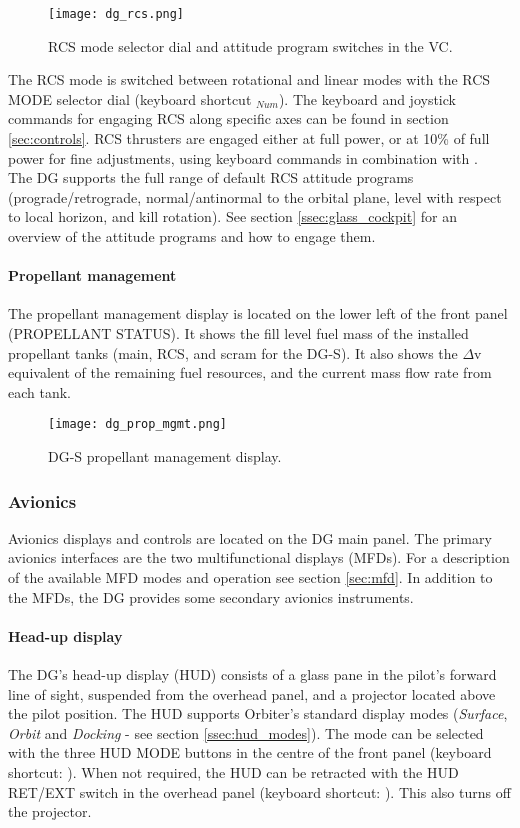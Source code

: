 \documentclass[Orbiter User Manual.tex]{subfiles}
\begin{document}
\begin{figure}[H]
  \centering
  \texttt{[image: dg\_rcs.png]}
  \caption{RCS mode selector dial and attitude program switches in the VC.}
\end{figure}

\noindent
The RCS mode is switched between rotational and linear modes with the RCS MODE selector dial (keyboard shortcut \keystroke{/}$_{Num}$). The keyboard and joystick commands for engaging RCS along specific axes can be found in section \ref{sec:controls}. RCS thrusters are engaged either at full power, or at 10\% of full power for fine adjustments, using keyboard commands in combination with \Ctrl.\\
The DG supports the full range of default RCS attitude programs (prograde/retrograde, normal/antinormal to the orbital plane, level with respect to local horizon, and kill rotation). See section \ref{ssec:glass_cockpit} for an overview of the attitude programs and how to engage them.

\paragraph{Propellant management}
The propellant management display is located on the lower left of the front panel (PROPELLANT STATUS). It shows the fill level fuel mass of the installed propellant tanks (main, RCS, and scram for the DG-S). It also shows the $\Delta$v equivalent of the remaining fuel resources, and the current mass flow rate from each tank.

\begin{figure}[H]
  \centering
  \texttt{[image: dg\_prop\_mgmt.png]}
  \caption{DG-S propellant management display.}
\end{figure}

\subsubsection{Avionics}
Avionics displays and controls are located on the DG main panel. The primary avionics interfaces are the two multifunctional displays (MFDs). For a description of the available MFD modes and operation see section \ref{sec:mfd}. In addition to the MFDs, the DG provides some secondary avionics instruments.

\paragraph{Head-up display}
The DG's head-up display (HUD) consists of a glass pane in the pilot's forward line of sight, suspended from the overhead panel, and a projector located above the pilot position. The HUD supports Orbiter's standard display modes (\textit{Surface}, \textit{Orbit} and \textit{Docking} - see section \ref{ssec:hud_modes}). The mode can be selected with the three HUD MODE buttons in the centre of the front panel (keyboard shortcut: ). When not required, the HUD can be retracted with the HUD RET/EXT switch in the overhead panel (keyboard shortcut: \Ctrl{}). This also turns off the projector.
\end{document}

